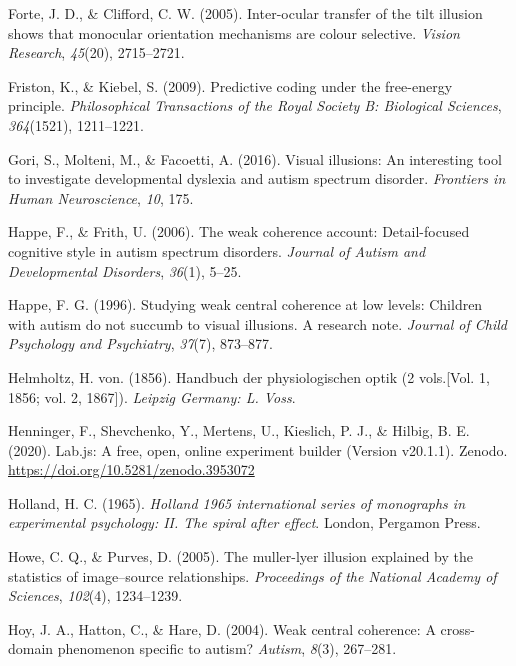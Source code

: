 \documentclass[
  english,
  man,floatsintext]{apa6}
\newlength{\cslhangindent}
\newenvironment{cslreferences}%
  {\setlength{\parindent}{0pt}%
  \everypar{\setlength{\hangindent}{\cslhangindent}}\ignorespaces}%
  {\par}
\begin{document}
\begin{cslreferences}
\leavevmode\hypertarget{ref-forte2005inter}{}%
Forte, J. D., \& Clifford, C. W. (2005). Inter-ocular transfer of the tilt illusion shows that monocular orientation mechanisms are colour selective. \emph{Vision Research}, \emph{45}(20), 2715--2721.

\leavevmode\hypertarget{ref-friston2009predictive}{}%
Friston, K., \& Kiebel, S. (2009). Predictive coding under the free-energy principle. \emph{Philosophical Transactions of the Royal Society B: Biological Sciences}, \emph{364}(1521), 1211--1221.

\leavevmode\hypertarget{ref-gori2016visual}{}%
Gori, S., Molteni, M., \& Facoetti, A. (2016). Visual illusions: An interesting tool to investigate developmental dyslexia and autism spectrum disorder. \emph{Frontiers in Human Neuroscience}, \emph{10}, 175.

\leavevmode\hypertarget{ref-happe2006weak}{}%
Happe, F., \& Frith, U. (2006). The weak coherence account: Detail-focused cognitive style in autism spectrum disorders. \emph{Journal of Autism and Developmental Disorders}, \emph{36}(1), 5--25.

\leavevmode\hypertarget{ref-happe1996studying}{}%
Happe, F. G. (1996). Studying weak central coherence at low levels: Children with autism do not succumb to visual illusions. A research note. \emph{Journal of Child Psychology and Psychiatry}, \emph{37}(7), 873--877.

\leavevmode\hypertarget{ref-helmholtz1856handbuch}{}%
Helmholtz, H. von. (1856). Handbuch der physiologischen optik (2 vols.{[}Vol. 1, 1856; vol. 2, 1867{]}). \emph{Leipzig Germany: L. Voss}.

\leavevmode\hypertarget{ref-henninger2020labjs}{}%
Henninger, F., Shevchenko, Y., Mertens, U., Kieslich, P. J., \& Hilbig, B. E. (2020). Lab.js: A free, open, online experiment builder (Version v20.1.1). Zenodo. \url{https://doi.org/10.5281/zenodo.3953072}

\leavevmode\hypertarget{ref-Holland1965}{}%
Holland, H. C. (1965). \emph{Holland 1965 international series of monographs in experimental psychology: II. The spiral after effect}. London, Pergamon Press.

\leavevmode\hypertarget{ref-howe2005muller}{}%
Howe, C. Q., \& Purves, D. (2005). The muller-lyer illusion explained by the statistics of image--source relationships. \emph{Proceedings of the National Academy of Sciences}, \emph{102}(4), 1234--1239.

\leavevmode\hypertarget{ref-hoy2004weak}{}%
Hoy, J. A., Hatton, C., \& Hare, D. (2004). Weak central coherence: A cross-domain phenomenon specific to autism? \emph{Autism}, \emph{8}(3), 267--281.


\end{cslreferences}
\end{document}
